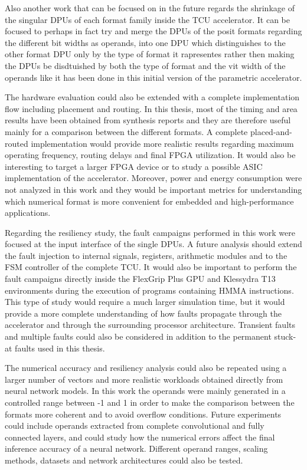 Also another work that can be focused on in the future regards the shrinkage of the singular DPUs of each format family inside the TCU accelerator. It can be focused to perhaps in fact try and merge the DPUs of the posit formats regarding the different bit widths as operands, into one DPU which distinguishes to the other format DPU only by the type of format it rapresentes rather then making the DPUs be disdtuished by both the type of format and the vit width of the operands like it has been done in this initial version of the parametric accelerator.

The hardware evaluation could also be extended with a complete
implementation flow including placement and routing. In this thesis,
most of the timing and area results have been obtained from synthesis
reports and they are therefore useful mainly for a comparison between
the different formats. A complete placed-and-routed implementation
would provide more realistic results regarding maximum operating
frequency, routing delays and final FPGA utilization. It would also be
interesting to target a larger FPGA device or to study a possible ASIC
implementation of the accelerator. Moreover, power and energy
consumption were not analyzed in this work and they would be important
metrics for understanding which numerical format is more convenient
for embedded and high-performance applications.

Regarding the resiliency study, the fault campaigns performed in this
work were focused at the input interface of the single DPUs. A future
analysis should extend the fault injection to internal signals,
registers, arithmetic modules and to the FSM controller of the complete
TCU. It would also be important to perform the fault campaigns directly
inside the FlexGrip Plus GPU and Klessydra T13 environments during the
execution of programs containing HMMA instructions. This type of study
would require a much larger simulation time, but it would provide a
more complete understanding of how faults propagate through the
accelerator and through the surrounding processor architecture.
Transient faults and multiple faults could also be considered in
addition to the permanent stuck-at faults used in this thesis.


The numerical accuracy and resiliency analysis could also be repeated
using a larger number of vectors and more realistic workloads obtained
directly from neural network models. In this work the operands were
mainly generated in a controlled range between -1 and 1 in order to
make the comparison between the formats more coherent and to avoid
overflow conditions. Future experiments could include operands
extracted from complete convolutional and fully connected layers, and
could study how the numerical errors affect the final inference
accuracy of a neural network. Different operand ranges, scaling
methods, datasets and network architectures could also be tested.


